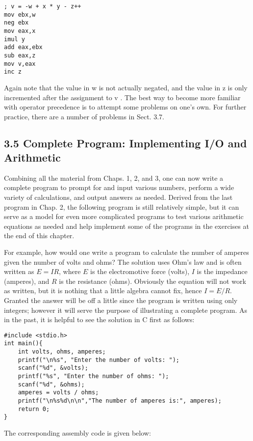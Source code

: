 \documentclass[10pt]{article}
\begin{document}
\begin{verbatim}
; v = -w + x * y - z++
mov ebx,w
neg ebx
mov eax,x
imul y
add eax,ebx
sub eax,z
mov v,eax
inc z
\end{verbatim}

Again note that the value in w is not actually negated, and the value in z is only incremented after the assignment to v . The best way to become more familiar with operator precedence is to attempt some problems on one's own. For further practice, there are a number of problems in Sect. 3.7.

\subsection*{3.5 Complete Program: Implementing I/O and Arithmetic}
Combining all the material from Chaps. 1, 2, and 3, one can now write a complete program to prompt for and input various numbers, perform a wide variety of calculations, and output answers as needed. Derived from the last program in Chap. 2, the following program is still relatively simple, but it can serve as a model for even more complicated programs to test various arithmetic equations as needed and help implement some of the programs in the exercises at the end of this chapter.

For example, how would one write a program to calculate the number of amperes given the number of volts and ohms? The solution uses Ohm's law and is often written as $E=I R$, where $E$ is the electromotive force (volts), $I$ is the impedance (amperes), and $R$ is the resistance (ohms). Obviously the equation will not work as written, but it is nothing that a little algebra cannot fix, hence $I=E / R$. Granted the answer will be off a little since the program is written using only integers; however it will serve the purpose of illustrating a complete program. As in the past, it is helpful to see the solution in C first as follows:

\begin{verbatim}
#include <stdio.h>
int main(){
    int volts, ohms, amperes;
    printf("\n%s", "Enter the number of volts: ");
    scanf("%d", &volts);
    printf("%s", "Enter the number of ohms: ");
    scanf("%d", &ohms);
    amperes = volts / ohms;
    printf("\n%s%d\n\n","The number of amperes is:", amperes);
    return 0;
}
\end{verbatim}

The corresponding assembly code is given below:
\end{document}
